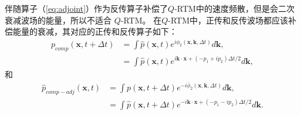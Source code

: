 伴随算子（\ref{eq:adjoint}）作为反传算子补偿了$Q$-RTM中的速度频散，但是会二次衰减波场的能量，所以不适合
$Q$-RTM。
在$Q$-RTM中，正传和反传波场都应该补偿能量的衰减，其对应的正传和反传算子如下：
\begin{equation}
	\begin{aligned}
		p_{comp}(\mathbf{x},t+\Delta t)&=\int \hat{p}(\mathbf{x},t)e^{i\phi_2(\mathbf{x},
		\mathbf{k},\Delta t)}d\mathbf{k}, \\
		&=\int \hat{p}(\mathbf{x},t)e^{i\mathbf{k}\cdot\mathbf{x}+(-p_1+ip_2)\Delta t/2}d\mathbf{k},
	\end{aligned}
	\label{eq:forward1}
\end{equation}
和
\begin{equation}
	\begin{aligned}
		\hat{p}_{comp-adj}(\mathbf{x},t)&=\int p(\mathbf{x},t+\Delta t)e^{-i\bar{\phi}_2(\mathbf{x},
		\mathbf{k},\Delta t)}d\mathbf{k}, \\
		&=\int \hat{p}(\mathbf{x},t+\Delta t)e^{-i\mathbf{k}\cdot\mathbf{x}+(-p_1-ip_2)\Delta t/2}d\mathbf{k}.
	\end{aligned}
	\label{eq:adjoint1}
\end{equation}
